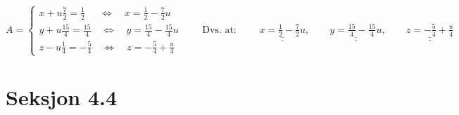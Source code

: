 \documentclass{article}
\newcommand{\uu}[1]{\underline{\underline{#1}}}
\newcommand{\eq}{\quad\Longleftrightarrow\quad}
\begin{document}
\vspace{2em}

\(A = 
\begin{cases}
    x + u\frac{7}{2} = \frac{1}{2} \ \ \eq x = \frac{1}{2} - \frac{7}{2}u\\
    y + u\frac{15}{4} = \frac{15}{4} \eq y = \frac{15}{4}-\frac{15}{4}u\\
    z -u\frac{1}{4} = -\frac{5}{4} \eq z = -\frac{5}{4} + \frac{u}{4}
\end{cases}
\qquad
\text{Dvs. at: } \qquad \uu{x = \frac{1}{2}-\frac{7}{2}u}, \qquad \uu{y = \frac{15}{4}-\frac{15}{4}u}, \qquad \uu{z=-\frac{5}{4}+\frac{u}{4}}
\)

\newpage
\section*{Seksjon 4.4}
\end{document}
